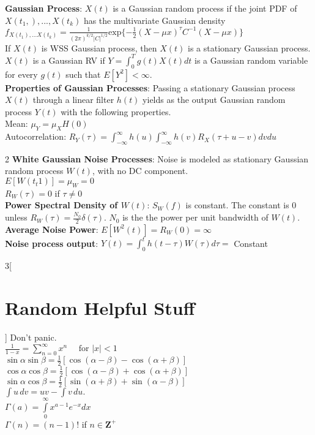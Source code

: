 \documentclass{article}
\begin{document}
	\textbf{Gaussian Process}: $X(t)$ is a Gaussian random process if the joint PDF of $X(t_1,), ..., X(t_k)$ has the multivariate Gaussian density $f_{X(t_1), ... X(t_k)} = \frac{1}{(2\pi)^{k/2}\vert C\vert^{1/2}}\text{exp}\{-\frac{1}{2}(X - \mu x)^{\tau}C^{-1}(X - \mu x)\}$
	\\
    If $X(t)$ is WSS Gaussian process, then $X(t)$ is a stationary Gaussian process.\\
	$X(t)$ is a Gaussian RV if $Y = \int_{0}^Tg(t)X(t)dt$ is a Gaussian random variable for every $g(t)$ such that $E[Y^2] < \infty$.\\
    \textbf{Properties of Gaussian Processes}: Passing a stationary Gaussian process $X(t)$ through a linear filter $h(t)$ yields as the output Gaussian random process $Y(t)$ with the following properties.\\
    Mean: $\mu_Y = \mu_XH(0)$\\
    Autocorrelation: $R_Y(\tau) = \int_{-\infty}^{\infty}h(u)\int_{-\infty}^{\infty}h(v)R_X(\tau + u - v)dvdu$\\
    
    \vspace{-1em}
	\begin{multicols}{2}
	\textbf{White Gaussian Noise Processes}: Noise is modeled as stationary Gaussian random process $W(t)$, with no DC component.\\
	$E[W(t_t1)] = \mu_W = 0$\\ $R_W(\tau) = 0$ if $\tau \neq 0$
	\\
	\textbf{Power Spectral Density of $W(t)$}:
	$S_W(f)$ is constant. The constant is 0 unless $R_W(\tau) = \frac{N_0}{2}\delta(\tau)$. $N_0$ is the the power per unit bandwidth of $W(t)$. 
	\\
	\textbf{Average Noise Power}: $E[W^2(t)] = R_W(0) = \infty$
	\\
	\textbf{Noise process output}: $Y(t) = \int_{0}^th(t - \tau)W(\tau)d\tau = $ Constant
	\end{multicols}
    
    \begin{multicols}{3}[\section*{Random Helpful Stuff}]
    Don't panic.\\
    $\frac{1}{1-x} = \sum^\infty_{n=0} x^n\quad\text{ for }|x| < 1\!$\\
    $\sin \alpha \sin \beta = \frac{1}{2}[\cos( \alpha - \beta) - \cos( \alpha + \beta)]$\\
    $\cos \alpha \cos \beta = \frac{1}{2}[\cos( \alpha - \beta) + \cos( \alpha + \beta)]$\\
    $\sin \alpha \cos \beta = \frac{1}{2}[\sin( \alpha + \beta) + \sin( \alpha - \beta)]$\\
    $\int u \, dv=uv-\int v \, du.\!$\\
    $\Gamma \left( a \right) = \int\limits_0^\infty {x^{a - 1} } e^{ - x} dx$\\
    $\Gamma \left(n \right) = (n - 1)!$ if $n \in \textbf{Z}^{+}$
	\end{multicols}
\end{document}
